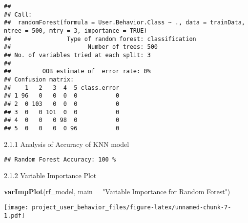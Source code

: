 \documentclass[
]{article}
\newenvironment{Shaded}{\begin{snugshade}}{\end{snugshade}}
\newcommand{\AttributeTok}[1]{\textcolor[rgb]{0.13,0.29,0.53}{#1}}
\newcommand{\CommentTok}[1]{\textcolor[rgb]{0.56,0.35,0.01}{\textit{#1}}}
\newcommand{\DecValTok}[1]{\textcolor[rgb]{0.00,0.00,0.81}{#1}}
\newcommand{\FunctionTok}[1]{\textcolor[rgb]{0.13,0.29,0.53}{\textbf{#1}}}
\newcommand{\NormalTok}[1]{#1}
\newcommand{\OtherTok}[1]{\textcolor[rgb]{0.56,0.35,0.01}{#1}}
\newcommand{\SpecialCharTok}[1]{\textcolor[rgb]{0.81,0.36,0.00}{\textbf{#1}}}
\newcommand{\StringTok}[1]{\textcolor[rgb]{0.31,0.60,0.02}{#1}}
\begin{document}
\begin{verbatim}
## 
## Call:
##  randomForest(formula = User.Behavior.Class ~ ., data = trainData,      ntree = 500, mtry = 3, importance = TRUE) 
##                Type of random forest: classification
##                      Number of trees: 500
## No. of variables tried at each split: 3
## 
##         OOB estimate of  error rate: 0%
## Confusion matrix:
##    1   2   3  4  5 class.error
## 1 96   0   0  0  0           0
## 2  0 103   0  0  0           0
## 3  0   0 101  0  0           0
## 4  0   0   0 98  0           0
## 5  0   0   0  0 96           0
\end{verbatim}

2.1.1 Analysis of Accuracy of KNN model

\begin{Shaded}
\end{Shaded}

\begin{verbatim}
## Random Forest Accuracy: 100 %
\end{verbatim}

2.1.2 Variable Importance Plot

\begin{Shaded}
\begin{Highlighting}[]
\FunctionTok{varImpPlot}\NormalTok{(rf\_model, }\AttributeTok{main =} \StringTok{"Variable Importance for Random Forest"}\NormalTok{)}
\end{Highlighting}
\end{Shaded}

\texttt{[image: project\_user\_behavior\_files/figure-latex/unnamed-chunk-7-1.pdf]}
\end{document}
